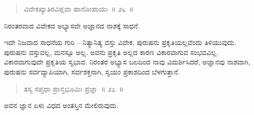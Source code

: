 \vspace{-0.3cm}

\begin{verse}
ವಿವೇಕಖ್ಯಾತಿರವಿಪ್ಲವಾ ಹಾನೋಪಾಯಃ~॥ ೨೬~॥
\end{verse}

\vspace{-0.3cm}

ನಿರಂತರವಾದ ವಿವೇಕದ ಅಭ್ಯಾಸವೇ ಅಜ್ಞಾನದ ನಾಶಕ್ಕೆ ಸಾಧನೆ. 

ಇದೇ ನಿಜವಾದ ಸಾಧನೆಯ ಗುರಿ – ನಿತ್ಯಾನಿತ್ಯ ವಸ್ತು ವಿವೇಕ, ಪುರುಷನು ಪ್ರಕೃತಿಯಲ್ಲವೆಂದು ತಿಳಿಯುವುದು. ಪುರುಷನು ವಸ್ತುವಲ್ಲ, ಮನಸ್ಸೂ ಅಲ್ಲ. ಅವನು ಪ್ರಕೃತಿ ಅಲ್ಲದ ಕಾರಣ ವಿಕಾರವಾಗುವ ಸಂಭವವಿಲ್ಲ. ವಿಕಾರವಾಗುವುದೇ ಪ್ರಕೃತಿಯ ಸ್ವಭಾವ. ನಿರಂತರ ಅಭ್ಯಾಸ ಬಲದಿಂದ ನಾವು ವಿಮರ್ಶಿಸಿದರೆ, ಅಜ್ಞಾನವು ನಾಶವಾಗಿ, ಪುರುಷನು ಸರ್ವವ್ಯಾಪಿಯಾಗಿ, ಸರ್ವಶಕ್ತನಾಗಿ, ಸ್ವಯಂ ಪ್ರಕಾಶದಿಂದ ಬೆಳಗುತ್ತಾನೆ. 

\vspace{-0.3cm}

\begin{verse}
ತಸ್ಯ ಸಪ್ತಧಾ ಪ್ರಾನ್ತಭೂಮಿಃ ಪ್ರಜ್ಞಾ~॥ ೨೭~॥
\end{verse}

\vspace{-0.3cm}

ಅವನ ಜ್ಞಾನ ಏಳು ವಿಧದ ಅಂತಸ್ತಿನ ಮೇಲಿರುವುದು. 

